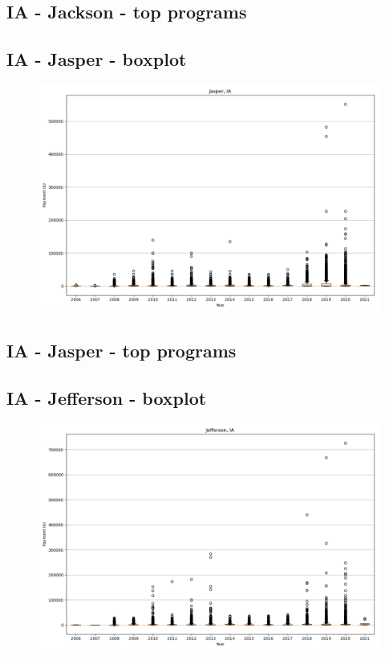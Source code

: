 \subsection*{IA - Jackson - top programs}

\newpage
\subsection*{IA - Jasper - boxplot}
\begin{figure}[h]
\centering
\includegraphics[width=7in]{../output/boxplots/counties/Jasper-IA_boxplot.png}
\end{figure}


\subsection*{IA - Jasper - top programs}

\newpage
\subsection*{IA - Jefferson - boxplot}
\begin{figure}[h]
\centering
\includegraphics[width=7in]{../output/boxplots/counties/Jefferson-IA_boxplot.png}
\end{figure}


